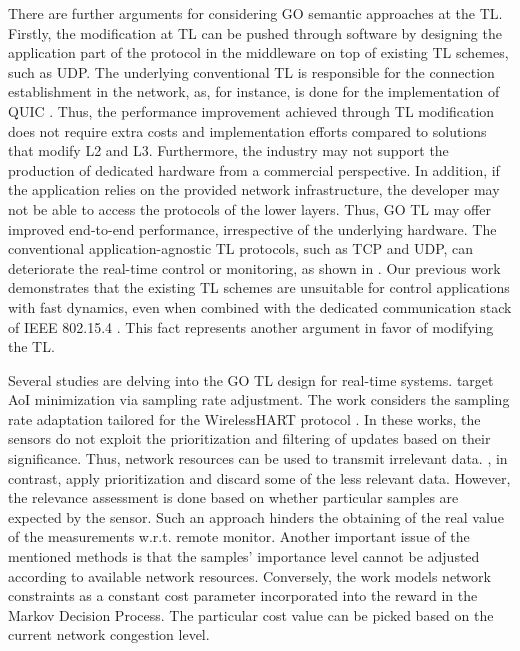 There are further arguments for considering GO semantic approaches at the TL. Firstly, the modification at TL can be pushed through software by designing the application part of the protocol in the middleware on top of existing TL schemes, such as UDP. The underlying conventional TL is responsible for the connection establishment in the network, as, for instance, is done for the implementation of QUIC \cite{langley2017quic}. Thus, the performance improvement achieved through TL modification does not require extra costs and implementation efforts compared to solutions that modify L2 and L3. Furthermore, the industry may not support the production of dedicated hardware from a commercial perspective. In addition, if the application relies on the provided network infrastructure, the developer may not be able to access the protocols of the lower layers. Thus, GO TL may offer improved end-to-end performance, irrespective of the underlying hardware. The conventional application-agnostic TL protocols, such as TCP and UDP, can deteriorate the real-time control or monitoring, as shown in \cite{beytur2020towards, ouguz2022implementation}. Our previous work \cite{kutsevol2023experimental} demonstrates that the existing TL schemes are unsuitable for control applications with fast dynamics, even when combined with the dedicated communication stack of IEEE 802.15.4 \cite{7460875}. This fact represents another argument in favor of modifying the TL.


Several studies are delving into the GO TL design for real-time systems. \cite{schmidtpredictably, shreedhar2019age} target AoI minimization via sampling rate adjustment. The work \cite{saifullah2014near} considers the sampling rate adaptation tailored for the WirelessHART protocol \cite{wirelesshart}. In these works, the sensors do not exploit the prioritization and filtering of updates based on their significance. Thus, network resources can be used to transmit irrelevant data. \cite{jarwan2021information, ngai2009information}, in contrast, apply prioritization and discard some of the less relevant data. However, the relevance assessment is done based on whether particular samples are expected by the sensor. Such an approach hinders the obtaining of the real value of the measurements w.r.t. remote monitor. Another important issue of the mentioned methods is that the samples' importance level cannot be adjusted according to available network resources. Conversely, the work \cite{jiang2020revealing} models network constraints as a constant cost parameter incorporated into the reward in the Markov Decision Process. The particular cost value can be picked based on the current network congestion level.


